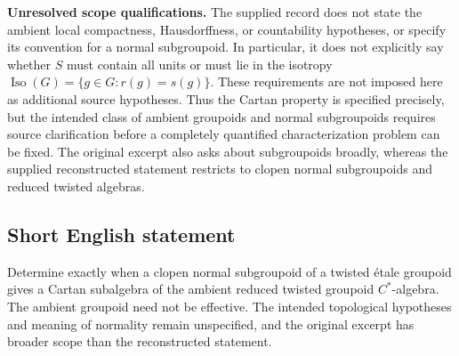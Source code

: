 \documentclass[11pt]{article}
\begin{document}
\textbf{Unresolved scope qualifications.} The supplied record does not state the ambient local compactness, Hausdorffness, or countability hypotheses, or specify its convention for a normal subgroupoid. In particular, it does not explicitly say whether \(S\) must contain all units or must lie in the isotropy \(\operatorname{Iso}(G)=\{g\in G:r(g)=s(g)\}\). These requirements are not imposed here as additional source hypotheses. Thus the Cartan property is specified precisely, but the intended class of ambient groupoids and normal subgroupoids requires source clarification before a completely quantified characterization problem can be fixed. The original excerpt also asks about subgroupoids broadly, whereas the supplied reconstructed statement restricts to clopen normal subgroupoids and reduced twisted algebras.
\subsection{Short English statement}
Determine exactly when a clopen normal subgroupoid of a twisted étale groupoid gives a Cartan subalgebra of the ambient reduced twisted groupoid \(C^*\)-algebra. The ambient groupoid need not be effective. The intended topological hypotheses and meaning of normality remain unspecified, and the original excerpt has broader scope than the reconstructed statement.
\end{document}
